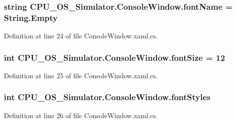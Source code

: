 \subsubsection[{font\+Name}]{\setlength{\rightskip}{0pt plus 5cm}string C\+P\+U\+\_\+\+O\+S\+\_\+\+Simulator.\+Console\+Window.\+font\+Name = String.\+Empty\hspace{0.3cm}{\ttfamily [private]}}\label{class_c_p_u___o_s___simulator_1_1_console_window_a78375ad950278e847c76e7de38aa1e31}


Definition at line 24 of file Console\+Window.\+xaml.\+cs.

\hypertarget{class_c_p_u___o_s___simulator_1_1_console_window_a0c319b98b649d11ffa185590e771cbb1}{}
\subsubsection[{font\+Size}]{\setlength{\rightskip}{0pt plus 5cm}int C\+P\+U\+\_\+\+O\+S\+\_\+\+Simulator.\+Console\+Window.\+font\+Size = 12\hspace{0.3cm}{\ttfamily [private]}}\label{class_c_p_u___o_s___simulator_1_1_console_window_a0c319b98b649d11ffa185590e771cbb1}


Definition at line 25 of file Console\+Window.\+xaml.\+cs.

\hypertarget{class_c_p_u___o_s___simulator_1_1_console_window_abe8a7e3f2f861cd266a24426b2ffbc1c}{}
\subsubsection[{font\+Styles}]{\setlength{\rightskip}{0pt plus 5cm}int C\+P\+U\+\_\+\+O\+S\+\_\+\+Simulator.\+Console\+Window.\+font\+Styles\hspace{0.3cm}{\ttfamily [private]}}\label{class_c_p_u___o_s___simulator_1_1_console_window_abe8a7e3f2f861cd266a24426b2ffbc1c}


Definition at line 26 of file Console\+Window.\+xaml.\+cs.

